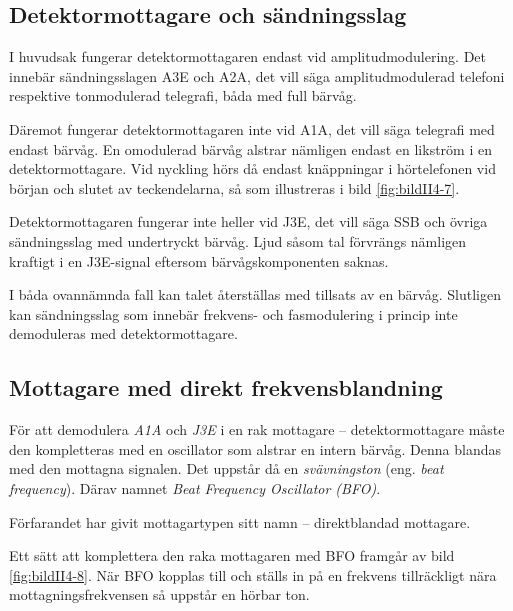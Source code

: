 \subsection{Detektormottagare och sändningsslag}

I huvudsak fungerar detektormottagaren endast vid amplitudmodulering.
Det innebär sändningsslagen A3E och A2A, det vill säga amplitudmodulerad
telefoni respektive tonmodulerad telegrafi, båda med full bärvåg.

Däremot fungerar detektormottagaren inte vid A1A, det vill säga telegrafi med
endast bärvåg.
En omodulerad bärvåg alstrar nämligen endast en likström i en
detektormottagare.
Vid nyckling hörs då endast knäppningar i hörtelefonen vid början och
slutet av teckendelarna, så som illustreras i bild \ref{fig:bildII4-7}.

Detektormottagaren fungerar inte heller vid J3E, det vill säga SSB och övriga
sändningsslag med undertryckt bärvåg.
Ljud såsom tal förvrängs nämligen kraftigt i en J3E-signal eftersom
bärvågskomponenten saknas.

I båda ovannämnda fall kan talet återställas med tillsats av en bärvåg.
Slutligen kan sändningsslag som innebär frekvens- och fasmodulering i
princip inte demoduleras med detektormottagare.


\subsection{Mottagare med direkt frekvensblandning}

För att demodulera \emph{A1A} och \emph{J3E} i en rak mottagare --
detektormottagare måste den kompletteras med en oscillator som alstrar en
intern bärvåg.
Denna blandas med den mottagna signalen.
Det uppstår då en \emph{svävningston} (eng. \emph{beat frequency}).
Därav namnet \emph{Beat Frequency Oscillator (BFO)}.

Förfarandet har givit mottagartypen sitt namn -- direktblandad mottagare.

Ett sätt att komplettera den raka mottagaren med BFO framgår av bild
\ref{fig:bildII4-8}.
När BFO kopplas till och ställs in på en frekvens tillräckligt
nära mottagningsfrekvensen så uppstår en hörbar ton.

